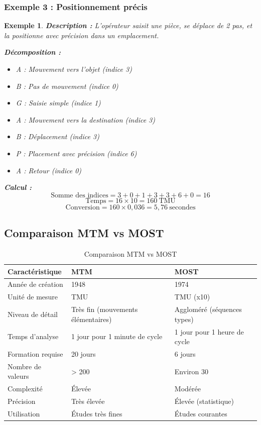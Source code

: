 \documentclass[a4paper,12pt]{article}
\newtheorem{exemple}{Exemple}[section]
\begin{document}
\subsubsection{Exemple 3 : Positionnement précis}

\begin{exemple}
\textbf{Description :} L'opérateur saisit une pièce, se déplace de 2 pas, et la positionne avec précision dans un emplacement.

\textbf{Décomposition :}
\begin{itemize}
    \item A : Mouvement vers l'objet (indice 3)
    \item B : Pas de mouvement (indice 0)
    \item G : Saisie simple (indice 1)
    \item A : Mouvement vers la destination (indice 3)
    \item B : Déplacement (indice 3)
    \item P : Placement avec précision (indice 6)
    \item A : Retour (indice 0)
\end{itemize}

\textbf{Calcul :}
\[
\text{Somme des indices} = 3 + 0 + 1 + 3 + 3 + 6 + 0 = 16
\]
\[
\text{Temps} = 16 \times 10 = 160\ \text{TMU}
\]
\[
\text{Conversion} = 160 \times 0,036 = 5,76\ \text{secondes}
\]
\end{exemple}

\subsection{Comparaison MTM vs MOST}

\begin{table}[ht]
\centering
\begin{tabular}{|p{4cm}|p{4.5cm}|p{4.5cm}|}
\hline
\textbf{Caractéristique} & \textbf{MTM} & \textbf{MOST} \\
\hline
Année de création & 1948 & 1974 \\
Unité de mesure & TMU & TMU (x10) \\
Niveau de détail & Très fin (mouvements élémentaires) & Aggloméré (séquences types) \\
Temps d'analyse & 1 jour pour 1 minute de cycle & 1 jour pour 1 heure de cycle \\
Formation requise & 20 jours & 6 jours \\
Nombre de valeurs & > 200 & Environ 30 \\
Complexité & Élevée & Modérée \\
Précision & Très élevée & Élevée (statistique) \\
Utilisation & Études très fines & Études courantes \\
\hline
\end{tabular}
\caption{Comparaison MTM vs MOST}
\end{table}
\end{document}
